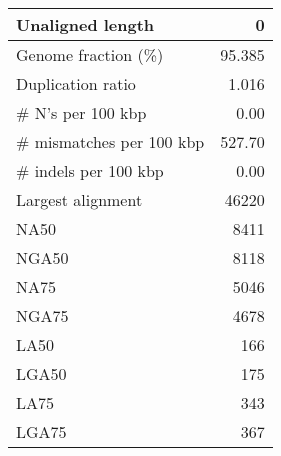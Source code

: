 \documentclass[12pt,a4paper]{article}
\begin{document}
\begin{table}[ht]
\begin{center}
\begin{tabular}{|l*{1}{|r}|}
Unaligned length & 0 \\ \hline
Genome fraction (\%) & 95.385 \\ \hline
Duplication ratio & 1.016 \\ \hline
\# N's per 100 kbp & 0.00 \\ \hline
\# mismatches per 100 kbp & 527.70 \\ \hline
\# indels per 100 kbp & 0.00 \\ \hline
Largest alignment & 46220 \\ \hline
NA50 & 8411 \\ \hline
NGA50 & 8118 \\ \hline
NA75 & 5046 \\ \hline
NGA75 & 4678 \\ \hline
LA50 & 166 \\ \hline
LGA50 & 175 \\ \hline
LA75 & 343 \\ \hline
LGA75 & 367 \\ \hline
\end{tabular}
\end{center}
\end{table}
\end{document}
